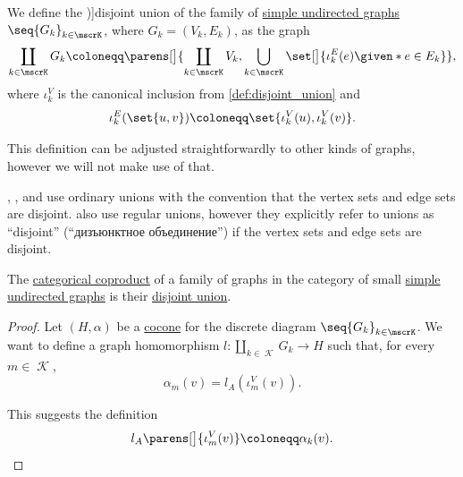 \begin{definition}\label{def:graph_disjoint_union}\mimprovised
  We define the \term[ru=дизъюнктное объедиение (графов) (\cite[19]{ЕмеличевИПр1990ТеорияГрафов})]{disjoint union} of the family of \hyperref[def:undirected_graph]{simple undirected graphs} \( \seq{ G_k }_{k \in \mscrK} \), where \( G_k = (V_k, E_k) \), as the graph
  \begin{equation*}
    \coprod_{k \in \mscrK} G_k \coloneqq \parens[\big]{ \coprod_{k \in \mscrK} V_k, \bigcup_{k \in \mscrK} \set[\big]{ \iota_k^E(e) \given* e \in E_k } },
  \end{equation*}
  where \( \iota_k^V \) is the canonical inclusion from \cref{def:disjoint_union} and
  \begin{equation*}
    \iota_k^E(\set{ u, v }) \coloneqq \set{ \iota_k^V(u), \iota_k^V(v) }.
  \end{equation*}
\end{definition}
\begin{comments}
  \item This definition can be adjusted straightforwardly to other kinds of graphs, however we will not make use of that.
  \item \Textcite[21]{Harary1969GraphTheory}, \textcite[def. 4.1.1]{Knauer2019AlgebraicGraphTheory}, \textcite[def. 10.2.9]{Rosen2019DiscreteMathematics} and \textcite[23]{Зыков2004ТеорияГрафов} use ordinary unions with the convention that the vertex sets and edge sets are disjoint. \Textcite[19]{ЕмеличевИПр1990ТеорияГрафов} also use regular unions, however they explicitly refer to unions as \enquote{disjoint} (\enquote{дизъюнктное объединение}) if the vertex sets and edge sets are disjoint.
\end{comments}

\begin{proposition}\label{thm:undirected_graph_coproduct}
  The \hyperref[def:categorical_coproduct]{categorical coproduct} of a family of graphs in the category of small \hyperref[def:undirected_graph]{simple undirected graphs} is their \hyperref[def:graph_disjoint_union]{disjoint union}.
\end{proposition}
\begin{proof}
  Let \( (H, \alpha) \) be a \hyperref[def:category_of_cocones/objects]{cocone} for the discrete diagram \( \seq{ G_k }_{k \in \mscrK} \). We want to define a graph homomorphism \( l: \coprod_{k \in \mscrK} G_k \to H \) such that, for every \( m \in \mscrK \),
  \begin{equation*}
    \alpha_m(v) = l_A(\iota^V_m(v)).
  \end{equation*}

  This suggests the definition
  \begin{equation*}
    l_A\parens[\big]{ \iota^V_m(v) } \coloneqq \alpha_k(v).
  \end{equation*}
\end{proof}

